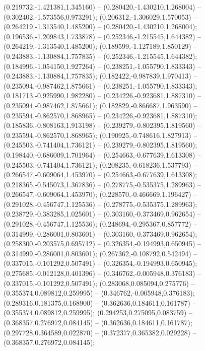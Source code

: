  (0.219732,-1.421381,1.345160) -- (0.280420,-1.430210,1.268004) -- (0.302402,-1.573556,0.973291);
 (0.206312,-1.306029,1.570053) -- (0.264219,-1.313540,1.485200) -- (0.280420,-1.430210,1.268004);
 (0.196536,-1.209843,1.733878) -- (0.252346,-1.215545,1.644382) -- (0.264219,-1.313540,1.485200);
 (0.189599,-1.127189,1.850129) -- (0.243883,-1.130884,1.757835) -- (0.252346,-1.215545,1.644382);
 (0.184996,-1.054150,1.927264) -- (0.238251,-1.055790,1.833343) -- (0.243883,-1.130884,1.757835);
 (0.182422,-0.987839,1.970413) -- (0.235094,-0.987462,1.875661) -- (0.238251,-1.055790,1.833343);
 (0.181713,-0.925990,1.982280) -- (0.234226,-0.923681,1.887310) -- (0.235094,-0.987462,1.875661);
 (0.182829,-0.866687,1.963590) -- (0.235594,-0.862570,1.868965) -- (0.234226,-0.923681,1.887310);
 (0.185836,-0.808163,1.913198) -- (0.239279,-0.802395,1.819560) -- (0.235594,-0.862570,1.868965);
 (0.190925,-0.748616,1.827913) -- (0.245503,-0.741404,1.736121) -- (0.239279,-0.802395,1.819560);
 (0.198440,-0.686009,1.701964) -- (0.254663,-0.677639,1.613308) -- (0.245503,-0.741404,1.736121);
 (0.208235,-0.618236,1.537793) -- (0.266547,-0.609064,1.453970) -- (0.254663,-0.677639,1.613308);
 (0.218365,-0.545073,1.367836) -- (0.278775,-0.535375,1.289963) -- (0.266547,-0.609064,1.453970);
 (0.228570,-0.466669,1.196427) -- (0.291028,-0.456747,1.125536) -- (0.278775,-0.535375,1.289963);
 (0.238729,-0.383285,1.025601) -- (0.303160,-0.373469,0.962654) -- (0.291028,-0.456747,1.125536);
 (0.248694,-0.295367,0.857772) -- (0.314999,-0.286001,0.803601) -- (0.303160,-0.373469,0.962654);
 (0.258300,-0.203575,0.695712) -- (0.326354,-0.194993,0.650945) -- (0.314999,-0.286001,0.803601);
 (0.267362,-0.108792,0.542494) -- (0.337015,-0.101292,0.507491) -- (0.326354,-0.194993,0.650945);
 (0.275685,-0.012128,0.401396) -- (0.346762,-0.005948,0.376183) -- (0.337015,-0.101292,0.507491);
 (0.283068,0.085094,0.275776) -- (0.355374,0.089812,0.259995) -- (0.346762,-0.005948,0.376183);
 (0.289316,0.181375,0.168900) -- (0.362636,0.184611,0.161787) -- (0.355374,0.089812,0.259995);
 (0.294253,0.275095,0.083759) -- (0.368357,0.276972,0.084145) -- (0.362636,0.184611,0.161787);
 (0.297728,0.364589,0.022870) -- (0.372377,0.365382,0.029228) -- (0.368357,0.276972,0.084145);

